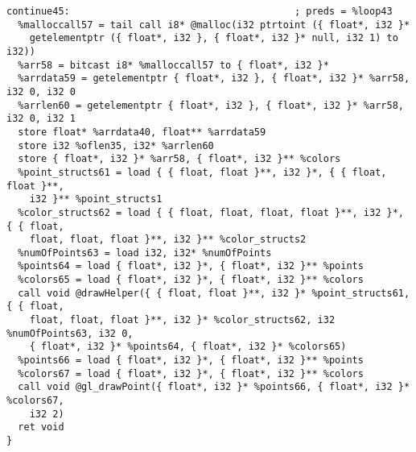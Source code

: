 \documentclass[main.tex]{subfiles}
\begin{document}
{\begin{lstlisting}
continue45:                                       ; preds = %loop43
  %malloccall57 = tail call i8* @malloc(i32 ptrtoint ({ float*, i32 }* 
    getelementptr ({ float*, i32 }, { float*, i32 }* null, i32 1) to i32))
  %arr58 = bitcast i8* %malloccall57 to { float*, i32 }*
  %arrdata59 = getelementptr { float*, i32 }, { float*, i32 }* %arr58, i32 0, i32 0
  %arrlen60 = getelementptr { float*, i32 }, { float*, i32 }* %arr58, i32 0, i32 1
  store float* %arrdata40, float** %arrdata59
  store i32 %oflen35, i32* %arrlen60
  store { float*, i32 }* %arr58, { float*, i32 }** %colors
  %point_structs61 = load { { float, float }**, i32 }*, { { float, float }**,
    i32 }** %point_structs1
  %color_structs62 = load { { float, float, float, float }**, i32 }*, { { float,
    float, float, float }**, i32 }** %color_structs2
  %numOfPoints63 = load i32, i32* %numOfPoints
  %points64 = load { float*, i32 }*, { float*, i32 }** %points
  %colors65 = load { float*, i32 }*, { float*, i32 }** %colors
  call void @drawHelper({ { float, float }**, i32 }* %point_structs61, { { float,
    float, float, float }**, i32 }* %color_structs62, i32 %numOfPoints63, i32 0,
    { float*, i32 }* %points64, { float*, i32 }* %colors65)
  %points66 = load { float*, i32 }*, { float*, i32 }** %points
  %colors67 = load { float*, i32 }*, { float*, i32 }** %colors
  call void @gl_drawPoint({ float*, i32 }* %points66, { float*, i32 }* %colors67,
    i32 2)
  ret void
}


\end{lstlisting}}
\end{document}
